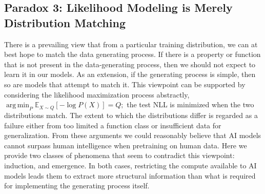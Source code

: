 \documentclass[twoside]{article}
\DeclareMathOperator*{\argmin}{arg\,min}
\begin{document}
\subsection{Paradox 3: Likelihood Modeling is Merely Distribution Matching}\label{sec:likelihood}
There is a prevailing view that from a particular training distribution, we can at best hope to match the data generating process. If there is a property or function that is not present in the data-generating process, then we should not expect to learn it in our models. As an extension, if the generating process is simple, then so are models that attempt to match it. This viewpoint can be supported by considering the likelihood maximization process abstractly,
%
%
%
%
$
\argmin_P\mathbb{E}_{X\sim Q}[-\log P(X)] = Q;
$
the test NLL is minimized when the two distributions match. The extent to which the distributions differ is regarded as a failure either from too limited a function class or insufficient data for generalization. From these arguments we could reasonably believe that AI models cannot surpass human intelligence when pretraining on human data. Here we provide two classes of phenomena that seem to contradict this viewpoint: induction, and emergence. In both cases, restricting the compute available to AI models leads them to extract more structural information than what is required for implementing the generating process itself.

%
%

%
\end{document}
